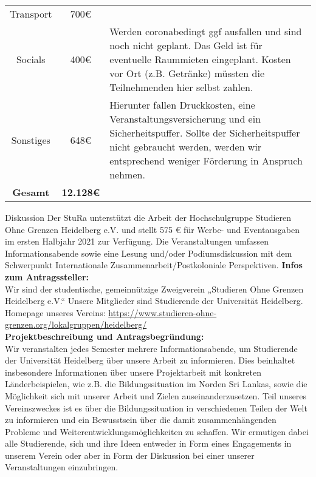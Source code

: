 {\begin{tabular}{c c p{10cm}}
        Transport & 700€ & \\
        Socials & 400€ & Werden coronabedingt ggf ausfallen und sind noch nicht geplant. Das Geld ist für eventuelle Raummieten eingeplant. Kosten vor Ort (z.B. Getränke) müssten die Teilnehmenden hier selbst zahlen. \\
        Sonstiges & 648€ & Hierunter fallen Druckkosten, eine Veranstaltungsversicherung und ein Sicherheitspuffer. Sollte der Sicherheitspuffer nicht gebraucht werden, werden wir entsprechend weniger Förderung in Anspruch nehmen. \\ 
        \textbf{Gesamt} & \textbf{12.128€} & \\       
    \end{tabular}
}{
    Diskussion
}
{
    Der StuRa unterstützt die Arbeit der Hochschulgruppe Studieren Ohne Grenzen Heidelberg e.V. und stellt 575 € für Werbe- und Eventausgaben im ersten Halbjahr 2021 zur Verfügung. Die Veranstaltungen umfassen Informationsabende sowie eine Lesung und/oder Podiumsdiskussion mit dem Schwerpunkt Internationale Zusammenarbeit/Postkoloniale Perspektiven.
}{
    \textbf{Infos zum Antragssteller:}\\
    Wir sind der studentische, gemeinnützige Zweigverein „Studieren Ohne Grenzen Heidelberg e.V.“ Unsere Mitglieder sind Studierende der Universität Heidelberg.\\
    Homepage unseres Vereins: \url{https://www.studieren-ohne-grenzen.org/lokalgruppen/heidelberg/}\\[1em]
    \textbf{Projektbeschreibung und Antragsbegründung:}\\
    Wir veranstalten jedes Semester mehrere Informationsabende, um Studierende der Universität Heidelberg über unsere Arbeit zu informieren. Dies beinhaltet insbesondere Informationen über unsere Projektarbeit mit konkreten Länderbeispielen, wie z.B. die Bildungssituation im Norden Sri Lankas, sowie die Möglichkeit sich mit unserer Arbeit und Zielen auseinanderzusetzen. Teil unseres Vereinszweckes ist es über die Bildungssituation in verschiedenen Teilen der Welt zu informieren und ein Bewusstsein über die damit zusammenhängenden Probleme und Weiterentwicklungsmöglichkeiten zu schaffen. Wir ermutigen dabei alle Studierende, sich und ihre Ideen entweder in Form eines Engagements in unserem Verein oder aber in Form der Diskussion bei einer unserer Veranstaltungen einzubringen.\\
}
